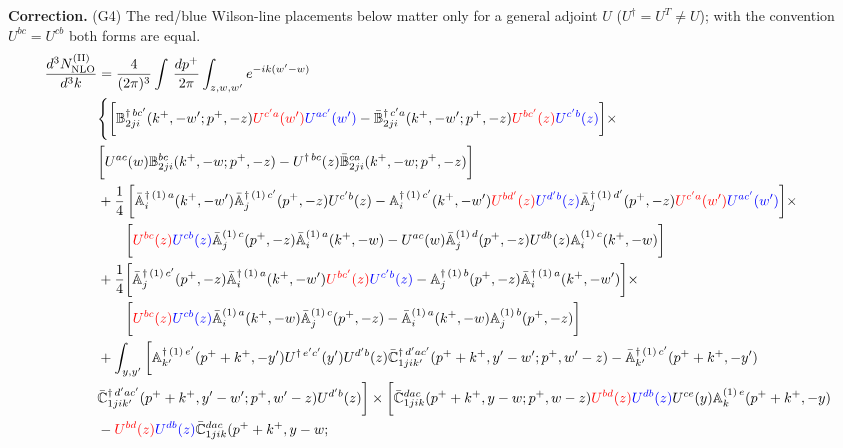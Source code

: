 \documentclass[10pt]{article}
\def\mf#1{\mathbb{#1}}
\numberwithin{equation}{section}
\begin{document}
{\color{blue}\noindent\textbf{Correction.} (G4) The red/blue Wilson-line placements below matter only for a general adjoint $U$ ($U^\dagger=U^T\neq U$); with the convention $U^{bc}=U^{cb}$ both forms are equal.}
\begin{align}\label{eq:CS2}
     \frac{d^{3}N_{\rm NLO}^{\rm (II)}}{d^{3}k} & = \frac{4}{(2\pi)^{3}} \int\, \frac{dp^{+}}{2\pi}\int_{z,w,w^{\prime}} e^{-ik(w^{\prime}-w)} \notag \\ & 
    \Bigg\{\bigg[\mf{B}^{\dagger\, bc^{\prime}}_{2ji}(k^{+},-w^{\prime};p^{+},-z)\textcolor{red}{U^{c^{\prime}a}(w^{\prime})}\textcolor{blue}{U^{ac^{\prime}}(w^{\prime})} -\Bar{\mf{B}}^{\dagger\, c^{\prime}a}_{2ji}(k^{+},-w^{\prime}; p^{+},-z)\textcolor{red}{U^{bc^{\prime}}(z)}\textcolor{blue}{U^{c^{\prime}b}(z)}\bigg]\times\notag \\ & \bigg[U^{ac}(w) \mf{B}^{bc}_{2ji}(k^{+},-w;p^{+},-z) -U^{\dagger\, bc}(z)\Bar{\mf{B}}^{ca}_{2ji}(k^{+},-w; p^{+},-z)\bigg]\notag \\ & + \frac{1}{4}\,\bigg[\Bar{\mf{A}}^{\dagger\, (1)\, a}_{i}(k^{+},-w^{\prime})\Bar{\mf{A}}^{\dagger\, (1)\, c^{\prime}}_{j}(p^{+},-z)U^{c^{\prime}b}(z)-\mf{A}^{\dagger\, (1)\, c^{\prime}}_{i}(k^{+},- w^{\prime})\textcolor{red}{U^{bd^{\prime}}(z)}\textcolor{blue}{U^{d^{\prime}b}(z)}\Bar{\mf{A}}^{\dagger\, (1)\, d^{\prime}}_{j}(p^{+},-z)\textcolor{red}{U^{c^{\prime}a}(w^{\prime})}\textcolor{blue}{U^{ac^{\prime}}(w^{\prime})}  \bigg]\times\notag \\ & \quad \quad\bigg[\textcolor{red}{U^{bc}(z)}\textcolor{blue}{U^{cb}(z)}\Bar{\mf{A}}^{(1)\, c}_{j}(p^{+},-z)\Bar{\mf{A}}^{(1)\, a}_{i}(k^{+},-w)-U^{ac}(w) \Bar{\mf{A}}^{(1)\, d}_{j}(p^{+},-z)U^{db}(z) \mf{A}^{(1)\, c}_{i}(k^{+},- w)\bigg] \notag \\ & +\frac{1}{4}\bigg[\Bar{\mf{A}}^{\dagger\,(1)\, c^{\prime}}_{j}(p^{+},-z)\Bar{\mf{A}}^{\dagger\, (1)\, a}_{i}(k^{+},- w^{\prime})\textcolor{red}{U^{bc^{\prime}}(z)}\textcolor{blue}{U^{c^{\prime}b}(z)} - \mf{A}^{\dagger\, (1)\, b}_{j}(p^{+},- z)\Bar{\mf{A}}^{\dagger\, (1)\, a}_{i}(k^{+},- w^{\prime})\bigg]\times\notag \\ & \quad \quad\bigg[\textcolor{red}{U^{bc}(z)}\textcolor{blue}{U^{cb}(z)}\Bar{\mf{A}}^{(1)\, a}_{i}(k^{+},- w)\Bar{\mf{A}}^{(1)\, c}_{j}(p^{+},-z)-\Bar{\mf{A}}^{(1)\, a}_{i}(k^{+},- w) \mf{A}^{(1)\, b}_{j}(p^{+},- z)\bigg]\notag \\ & + \int_{y,y^{\prime}}\bigg[\mf{A}^{\dagger\, (1)\,e^{\prime}}_{k^{\prime}}(p^{+}+k^{+},-y^{\prime})U^{\dagger\, e^{\prime}c^{\prime}}(y^{\prime})U^{d^{\prime}b}(z) \Bar{\mf{C}}^{\dagger\, d^{\prime}ac^{\prime}}_{1jik^{\prime}}(p^{+}+k^{+},y^{\prime}-w^{\prime}; p^{+},w^{\prime}-z)  -\Bar{\mf{A}}^{\dagger\, (1)\,c^{\prime}}_{k^{\prime}}(p^{+}+k^{+},-y^{\prime})\notag \\ & \Bar{\mf{C}}^{\dagger\, d^{\prime}ac^{\prime}}_{1jik^{\prime}}(p^{+}+k^{+},y^{\prime}-w^{\prime}; p^{+},w^{\prime}-z)U^{d^{\prime}b}(z)\bigg]\times\bigg[\Bar{\mf{C}}^{dac}_{1jik}(p^{+}+k^{+},y-w; p^{+},w-z)\textcolor{red}{U^{bd}(z)}\textcolor{blue}{U^{db}(z)}U^{ce}(y) \mf{A}^{(1)\,e}_{k}(p^{+}+k^{+},-y)\notag \\ & -\textcolor{red}{U^{bd}(z)}\textcolor{blue}{U^{db}(z)} \Bar{\mf{C}}^{dac}_{1jik}(p^{+}+k^{+},y-w; 
\end{align}
\end{document}
